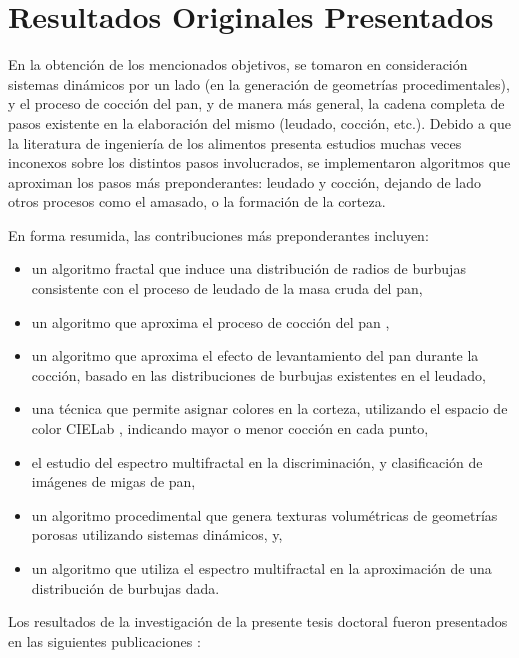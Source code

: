 \section{Resultados Originales Presentados}
En la obtención de los mencionados objetivos, se tomaron en consideración sistemas dinámicos por un lado (en la generación de geometrías procedimentales), y el proceso de cocción del pan, y de manera más general, la cadena completa de pasos existente en la elaboración del mismo (leudado, cocción, etc.).
Debido a que la literatura de ingeniería de los alimentos presenta estudios muchas veces inconexos sobre los distintos pasos involucrados, se implementaron algoritmos que aproximan los pasos más preponderantes: leudado y cocción, dejando de lado otros procesos como el amasado, o la formación de la corteza.

En forma resumida, las contribuciones más preponderantes incluyen:
\begin{itemize}
\item un algoritmo fractal \cite{Mandelbrot1983} que induce una distribución de radios de burbujas consistente con el proceso de leudado de la masa cruda del pan,
\item un algoritmo que aproxima el proceso de cocción del pan \cite{Powathil2004},
\item un algoritmo que aproxima el efecto de levantamiento del pan durante la cocción, basado en las distribuciones de burbujas existentes en el leudado,
\item una técnica que permite asignar colores en la corteza, utilizando el espacio de color CIELab \cite{Hunter58}, indicando mayor o menor cocción en cada punto,
\item el estudio del espectro multifractal \cite{Xu2009} en la discriminación, y clasificación de imágenes de migas de pan,
\item un algoritmo procedimental que genera texturas volumétricas de geometrías porosas utilizando sistemas dinámicos, y,
\item un algoritmo que utiliza el espectro multifractal en la aproximación de una distribución de burbujas dada.
\end{itemize}

Los resultados de la investigación de la presente tesis doctoral fueron presentados en las siguientes publicaciones \cite{Baravalle2011, Baravalle2012, Baravalle2012_2, Baravalle2012_3, Baravalle2013, Baravalle2014, Baravalle2014_2, Baravalle2015, Baravalle2015_2, Baravalle2016}:

